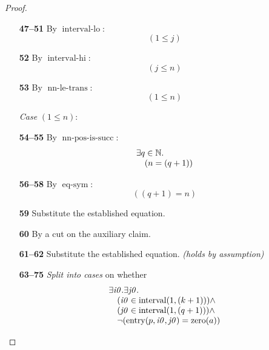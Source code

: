 \documentclass[11pt]{article}
\theoremstyle{plain}
\begin{document}
\begin{proof}
\begin{itemize}[leftmargin=2.8em, itemsep=4pt, parsep=1pt]
  \item[\textbf{47--51}] By $\operatorname{interval\text{-}lo}$:
\begin{equation*}
(1 \leq j)
\end{equation*}

  \item[\textbf{52}] By $\operatorname{interval\text{-}hi}$:
\begin{equation*}
(j \leq n)
\end{equation*}

  \item[\textbf{53}] By $\operatorname{nn\text{-}le\text{-}trans}$:
\begin{equation*}
(1 \leq n)
\end{equation*}

  \item[]\emph{Case} $(1 \leq n)$:
  \item[\textbf{54--55}] By $\operatorname{nn\text{-}pos\text{-}is\text{-}succ}$:
\begin{equation*}
\begin{array}{@{}l@{}} \exists q \in \mathbb{N}. \\ \quad (n = (q + 1)) \end{array}
\end{equation*}

  \item[\textbf{56--58}] By $\operatorname{eq\text{-}sym}$:
\begin{equation*}
((q + 1) = n)
\end{equation*}

  \item[\textbf{59}] Substitute the established equation.
  \item[\textbf{60}] By a cut on the auxiliary claim.
  \item[\textbf{61--62}] Substitute the established equation.  \emph{(holds by assumption)}
  \item[\textbf{63--75}] \emph{Split into cases} on whether
\begin{equation*}
\begin{array}{@{}l@{}} \exists \mathit{i0}. \exists \mathit{j0}. \\ \quad (\mathit{i0} \in \operatorname{interval}(1, (k + 1))) \wedge \\ \quad (\mathit{j0} \in \operatorname{interval}(1, (q + 1))) \wedge \\ \quad \neg (\operatorname{entry}(p, \mathit{i0}, \mathit{j0}) = \operatorname{zero}(a)) \end{array}
\end{equation*}


\end{itemize}
\end{proof}
\end{document}
